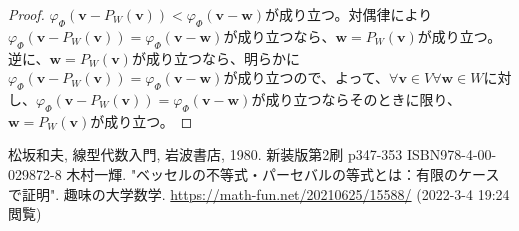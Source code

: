\documentclass[dvipdfmx]{jsarticle}
\begin{document}
\begin{proof}
$\varphi_{\varPhi }\left( \mathbf{v} - P_{W}\left( \mathbf{v} \right) \right) < \varphi_{\varPhi }\left( \mathbf{v} - \mathbf{w} \right)$が成り立つ。対偶律により$\varphi_{\varPhi }\left( \mathbf{v} - P_{W}\left( \mathbf{v} \right) \right) = \varphi_{\varPhi }\left( \mathbf{v} - \mathbf{w} \right)$が成り立つなら、$\mathbf{w} = P_{W}\left( \mathbf{v} \right)$が成り立つ。逆に、$\mathbf{w} = P_{W}\left( \mathbf{v} \right)$が成り立つなら、明らかに$\varphi_{\varPhi }\left( \mathbf{v} - P_{W}\left( \mathbf{v} \right) \right) = \varphi_{\varPhi }\left( \mathbf{v} - \mathbf{w} \right)$が成り立つので、よって、$\forall\mathbf{v} \in V\forall\mathbf{w} \in W$に対し、$\varphi_{\varPhi }\left( \mathbf{v} - P_{W}\left( \mathbf{v} \right) \right) = \varphi_{\varPhi }\left( \mathbf{v} - \mathbf{w} \right)$が成り立つならそのときに限り、$\mathbf{w} = P_{W}\left( \mathbf{v} \right)$が成り立つ。
\end{proof}
\begin{thebibliography}{50}
  松坂和夫, 線型代数入門, 岩波書店, 1980. 新装版第2刷 p347-353 ISBN978-4-00-029872-8
  木村一輝. "ベッセルの不等式・パーセバルの等式とは：有限のケースで証明". 趣味の大学数学. \url{https://math-fun.net/20210625/15588/} (2022-3-4 19:24 閲覧)
\end{thebibliography}
\end{document}
